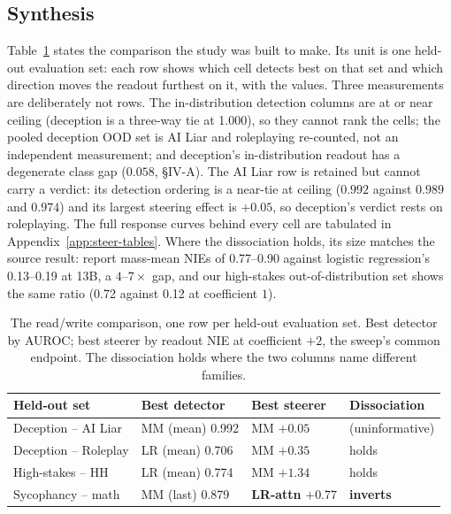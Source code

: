 \documentclass[conference]{IEEEtran}
\begin{document}
\subsection{Synthesis}
Table~\ref{tab:synth} states the comparison the study was built to make. Its
unit is one held-out evaluation set: each row shows which cell detects best on
that set and which direction moves the readout furthest on it, with the values.
Three measurements are deliberately not rows. The in-distribution detection
columns are at or near ceiling (deception is a three-way tie at 1.000), so they
cannot rank the cells; the pooled deception OOD set is AI Liar and roleplaying
re-counted, not an independent measurement; and deception's in-distribution
readout has a degenerate class gap ($0.058$, §IV-A). The AI Liar row is
retained but cannot carry a verdict: its detection ordering is a near-tie at
ceiling ($0.992$ against $0.989$ and $0.974$) and its largest steering effect
is $+0.05$, so deception's verdict rests on roleplaying. The full response
curves behind every cell are tabulated in Appendix~\ref{app:steer-tables}.
Where the dissociation holds, its size matches the source result:
\citeauthor{marks2024} report mass-mean NIEs of 0.77--0.90 against
logistic regression's 0.13--0.19 at 13B, a $4$--$7\times$ gap, and our
high-stakes out-of-distribution set shows the same ratio (0.72 against 0.12
at coefficient $1$).

\begin{table}[t]
\caption{The read/write comparison, one row per held-out evaluation set. Best
detector by AUROC; best steerer by readout NIE at coefficient $+2$, the sweep's
common endpoint. The dissociation holds where the two columns name different
families.}
\label{tab:synth}
\centering
\footnotesize
\setlength{\tabcolsep}{2pt}
\begin{tabular}{llll}
\toprule
\textbf{Held-out set} & \textbf{Best detector} & \textbf{Best steerer} & \textbf{Dissociation} \\
\midrule
Deception -- AI Liar & MM (mean) 0.992 & MM $+0.05$ & (uninformative) \\
Deception -- Roleplay & LR (mean) 0.706 & MM $+0.35$ & holds \\
High-stakes -- HH & LR (mean) 0.774 & MM $+1.34$ & holds \\
Sycophancy -- math & MM (last) 0.879 & \textbf{LR-attn} $+0.77$ & \textbf{inverts} \\
\bottomrule
\end{tabular}
\end{table}
\end{document}
